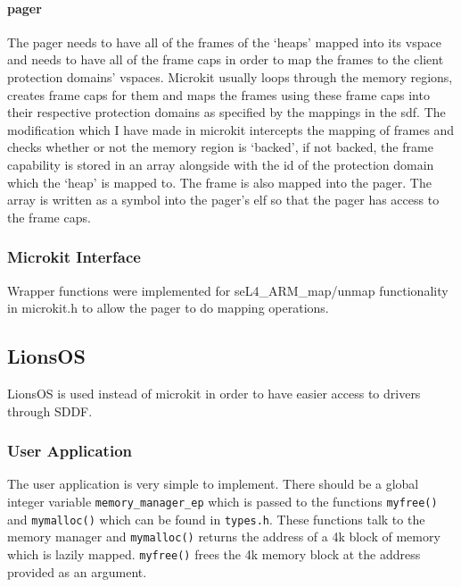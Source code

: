 \documentclass{article}
\begin{document}
\paragraph{pager}
The pager needs to have all of the frames of the `heaps' mapped into its vspace and needs to have all of the frame caps in order to map the frames to the client protection domains' vspaces. Microkit usually loops through the memory regions, creates frame caps for them and maps the frames using these frame caps into their respective protection domains as specified by the mappings in the sdf. The modification which I have made in microkit intercepts the mapping of frames and checks whether or not the memory region is `backed', if not backed, the frame capability is stored in an array alongside with the id of the protection domain which the `heap' is mapped to. The frame is also mapped into the pager. The array is written as a symbol into the pager's elf so that the pager has access to the frame caps.
\subsubsection{Microkit Interface}
Wrapper functions were implemented for seL4\_ARM\_map/unmap functionality in microkit.h to allow the pager to do mapping operations.
\subsection{LionsOS}
LionsOS is used instead of microkit in order to have easier access to drivers through SDDF. 
\subsubsection{User Application}
The user application is very simple to implement. There should be a global integer variable \texttt{memory\_manager\_ep} which is passed to the functions \texttt{myfree()} and \texttt{mymalloc()} which can be found in \texttt{types.h}. These functions talk to the memory manager and \texttt{mymalloc()} returns the address of a 4k block of memory which is lazily mapped. \texttt{myfree()} frees the 4k memory block at the address provided as an argument.
\end{document}
